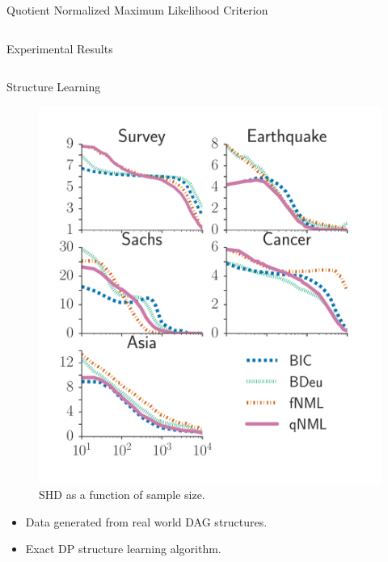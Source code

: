 \documentclass[final]{beamer}
\newcommand{\heading}[1]{\alert{\large #1}\\}
\theoremstyle{plain}
\begin{document}
\begin{frame}{}
\begin{block}{Quotient Normalized Maximum Likelihood Criterion}
\begin{columns}[T]
\end{columns}
\end{block}

\begin{block}{Experimental Results}
  \begin{columns}[T]
    \begin{column}{0.35\textwidth}
      \heading{Structure Learning}
      
	  \begin{minipage}{0.45\textwidth}
	  \begin{figure}[h]

		\includegraphics[width=\columnwidth]{shd_all.pdf}
		\caption{SHD as a function of sample size.}
		\label{fig:all_shd}
		\end{figure}
	  \end{minipage}
	  \begin{minipage}{0.45\textwidth}
	  \begin{itemize}
	  \item Data generated from real world DAG structures.
	  \item Exact DP structure learning algorithm.
	  \end{itemize}
	  \begin{figure}[h]

\end{figure}
\end{minipage}
\end{column}
\end{columns}
\end{block}
\end{frame}
\end{document}
